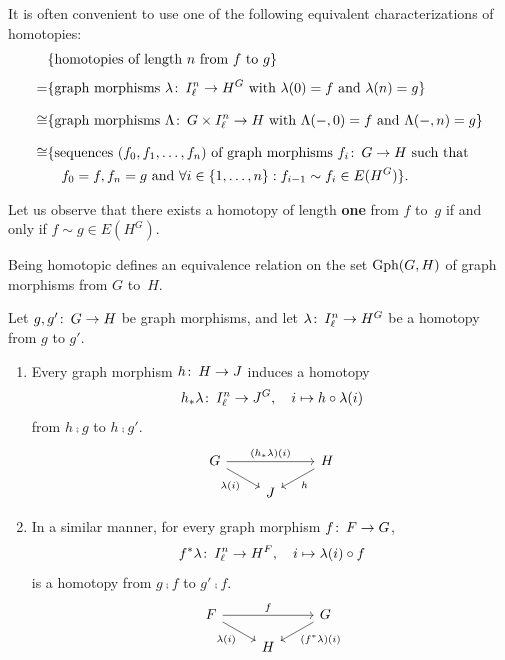 \documentclass[11pt,a4paper]{article}
\begin{document}
	It is often convenient to use one of the following equivalent characterizations of homotopies:
		\begin{align*}
			&\{ \textup{homotopies of length } n \textup{ from } f \textup{ to } g \} \\[4pt]
			= &\{ \textup{graph morphisms } \lambda\colon\thinspace I^n_\ell\to H^G \textup{ with } \lambda(0)=f \textup{ and } \lambda(n)=g \} \\[8pt]			
			\cong &\{ \textup{graph morphisms } \Lambda\colon\thinspace G\times I^n_\ell\to H \textup{ with } \Lambda(-,0)=f \textup{ and } \Lambda(-,n)=g \} \\[8pt]
			\cong &\{ \textup{sequences } (f_0,f_1,\dots,f_n) \textup{ of graph morphisms } f_i\colon\thinspace G\to H \textup{ such that } \\
			&\quad f_0=f, f_n=g \textup{ and } \forall i\in\{1,\dots,n\}: f_{i-1}\sim f_i\in E(H^G) \}.
		\end{align*}

	Let us observe that there exists a homotopy of length \textbf{one} from $f$ to~$g$ if and only if $f\sim g\in E(H^G)$.
	
	\begin{rmk}
		Being homotopic defines an equivalence relation on the set $\textup{Gph}(G,H)$ of graph morphisms from $G$ to~$H$.	
	\end{rmk}
		
	\begin{lemma}
		Let $g,g'\colon\thinspace G\to H$ be graph morphisms, and let $\lambda\colon\thinspace I^n_\ell\to H^G$ be a homotopy from $g$ to $g'$.
		\begin{enumerate}
		\renewcommand{\labelenumi}{(\theenumi)}
			\item Every graph morphism $h\colon\thinspace H\to J$ induces a homotopy  
			\[ h_\ast\lambda\colon\thinspace I^n_\ell\to J^G, \quad i\mapsto h\mathbin{\circ}\lambda(i) \]
			from $h\comp g$ to $h\comp g'$.
			\begin{equation*}
				\begin{tikzcd}[row sep=small]
					G \arrow[rr, "(h_\ast\lambda)(i)"] \arrow[rd, 	"\lambda(i)", swap] 
					& & H \arrow[ld, "h"] 
					\\ & J
				\end{tikzcd}
			\end{equation*}			

			\item In a similar manner, for every graph morphism $f\colon\thinspace F\to G$,
			\[ f^\ast\lambda\colon\thinspace I^n_\ell\to H^F, \quad i\mapsto \lambda(i)\mathbin{\circ} f \]
			is a homotopy from $g\comp f$ to $g'\comp f$.
			\begin{equation*}
				\begin{tikzcd}[row sep=small]
					F \arrow[rr, "f"] \arrow[rd, "\lambda(i)", swap] 
					& & G \arrow[ld, "(f^\ast\lambda)(i)"] 
					\\ & H
				\end{tikzcd}
			\end{equation*}			
		\end{enumerate}
	\end{lemma}
\end{document}
